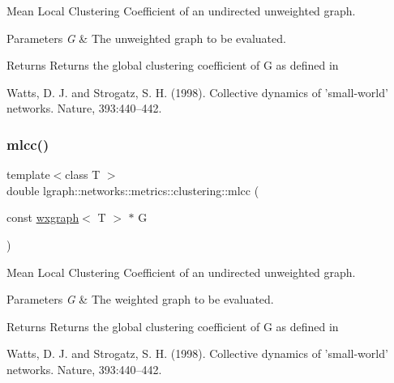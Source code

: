 Mean Local Clustering Coefficient of an undirected unweighted graph. 


\begin{DoxyParams}{Parameters}
{\em G} & The unweighted graph to be evaluated. \\
\hline
\end{DoxyParams}
\begin{DoxyReturn}{Returns}
Returns the global clustering coefficient of G as defined in \begin{DoxyVerb}Watts, D. J. and Strogatz, S. H. (1998). Collective
dynamics of ’small-world’ networks. Nature, 393:440–442.
\end{DoxyVerb}
 
\end{DoxyReturn}
\mbox{\label{namespacelgraph_1_1networks_1_1metrics_1_1clustering_a1339f3f6a8c6044f57829d080cc742f2}} 
\subsubsection{\texorpdfstring{mlcc()}{mlcc()}\hspace{0.1cm}{\footnotesize\ttfamily [2/2]}}
{\footnotesize\ttfamily template$<$class T $>$ \\
double lgraph\+::networks\+::metrics\+::clustering\+::mlcc (\begin{DoxyParamCaption}\item[{const \hyperlink{classlgraph_1_1wxgraph}{wxgraph}$<$ T $>$ $\ast$}]{G }\end{DoxyParamCaption})}



Mean Local Clustering Coefficient of an undirected unweighted graph. 


\begin{DoxyParams}{Parameters}
{\em G} & The weighted graph to be evaluated. \\
\hline
\end{DoxyParams}
\begin{DoxyReturn}{Returns}
Returns the global clustering coefficient of G as defined in \begin{DoxyVerb}Watts, D. J. and Strogatz, S. H. (1998). Collective
dynamics of ’small-world’ networks. Nature, 393:440–442.
\end{DoxyVerb}
 
\end{DoxyReturn}
